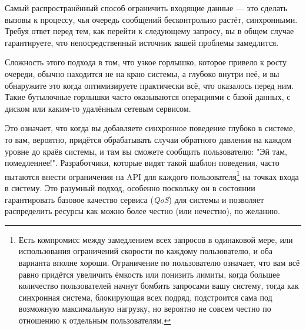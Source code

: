 \documentclass[11pt, oneside]{book}   	%
\begin{document}
Самый распространённый способ ограничить входящие данные --- это сделать вызовы к процессу, чья очередь сообщений бесконтрольно растёт, синхронными. Требуя ответ перед тем, как перейти к следующему запросу, вы в общем случае гарантируете, что непосредственный источник вашей проблемы замедлится.

Сложность этого подхода в том, что узкое горлышко, которое привело к росту очереди, обычно находится не на краю системы, а глубоко внутри неё, и вы обнаружите это когда оптимизируете практически всё, что оказалось перед ним. Такие бутылочные горлышки часто оказываются операциями с базой данных, с диском или каким-то удалённым сетевым сервисом.

Это означает, что когда вы добавляете синхронное поведение глубоко в системе, то вам, вероятно, придётся обрабатывать случаи обратного давления на каждом уровне до краёв системы, и там вы сможете сообщить пользователю: "Эй там, помедленнее!".
Разработчики, которые видят такой шаблон поведения, часто пытаются внести ограничения на API для каждого пользователя\footnote{Есть компромисс между замедлением всех запросов в одинаковой мере, или использования ограничений скорости по каждому пользователю, и оба варианта вполне хороши. Ограничение по пользователю означает, что вам всё равно придётся увеличить ёмкость или понизить лимиты, когда большее количество пользователей начнут бомбить запросами вашу систему, тогда как синхронная система, блокирующая всех подряд, подстроится сама под возможную максимальную нагрузку, но вероятно не совсем честно по отношению к отдельным пользователям.} на точках входа в систему. Это разумный подход, особенно поскольку он в состоянии гарантировать базовое качество сервиса (\emph{QoS}) для системы и позволяет распределить ресурсы как можно более честно (или нечестно), по желанию.
\end{document}
